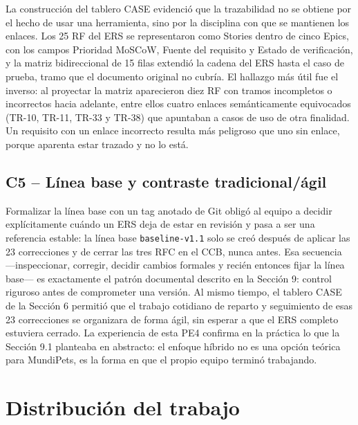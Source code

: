 \documentclass[journal,onecolumn]{IEEEtran}
\begin{document}
	La construcción del tablero CASE evidenció que la trazabilidad no se obtiene por el hecho de usar
	una herramienta, sino por la disciplina con que se mantienen los enlaces. Los 25 RF del ERS se
	representaron como Stories dentro de cinco Epics, con los campos Prioridad MoSCoW, Fuente del
	requisito y Estado de verificación, y la matriz bidireccional de 15 filas extendió la cadena del
	ERS hasta el caso de prueba, tramo que el documento original no cubría. El hallazgo más útil fue
	el inverso: al proyectar la matriz aparecieron diez RF con tramos incompletos o incorrectos hacia
	adelante, entre ellos cuatro enlaces semánticamente equivocados (TR-10, TR-11, TR-33 y TR-38) que
	apuntaban a casos de uso de otra finalidad. Un requisito con un enlace incorrecto resulta más
	peligroso que uno sin enlace, porque aparenta estar trazado y no lo está.
	
	\subsection*{C5 -- Línea base y contraste tradicional/ágil}
	
	Formalizar la línea base con un tag anotado de Git obligó al equipo a decidir explícitamente
	cuándo un ERS deja de estar en revisión y pasa a ser una referencia estable: la línea base
	\texttt{baseline-v1.1} solo se creó después de aplicar las 23 correcciones y de cerrar las tres
	RFC en el CCB, nunca antes. Esa secuencia —inspeccionar, corregir, decidir cambios formales y
	recién entonces fijar la línea base— es exactamente el patrón documental descrito en la Sección 9:
	control riguroso antes de comprometer una versión. Al mismo tiempo, el tablero CASE de la Sección
	6 permitió que el trabajo cotidiano de reparto y seguimiento de esas 23 correcciones se organizara
	de forma ágil, sin esperar a que el ERS completo estuviera cerrado. La experiencia de esta PE4
	confirma en la práctica lo que la Sección 9.1 planteaba en abstracto: el enfoque híbrido no es una
	opción teórica para MundiPets, es la forma en que el propio equipo terminó trabajando.
	\newpage
	\section{Distribución del trabajo}
	
\end{document}
